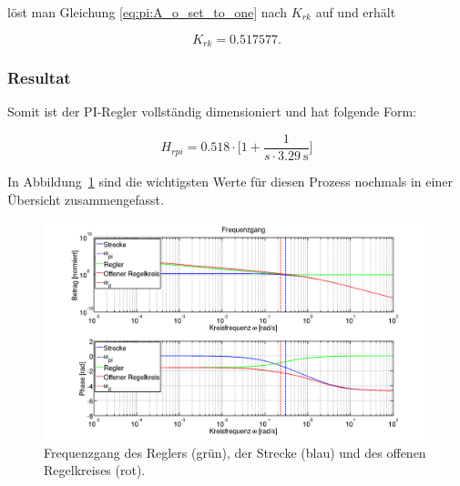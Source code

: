 l\"ost  man Gleichung  \ref{eq:pi:A_o_set_to_one}  nach  $K_{rk}$ auf  und
erh\"alt

\begin{equation} \label{eq:pi:k_rk_result}
    K_{rk} = 0.517577.
\end{equation}


\clearpage
\subsubsection{Resultat}

Somit ist der PI-Regler vollst\"andig dimensioniert und hat folgende Form:

\begin{equation} \label{eq:pi:result}
    H_{rpi} = 0.518 \cdot \biggl[ 1 + \frac{1}{s \cdot \SI{3.29}{\second}} \biggr]
\end{equation}

In Abbildung~\ref{fig:pi:all} sind die  wichtigsten Werte f\"ur diesen Prozess
nochmals in einer \"Ubersicht zusammengefasst.

\begin{figure}[h! width=\pagewidth]
    \includegraphics[width=\textwidth]{images/piBode.png}
    \caption{%
        Frequenzgang des Reglers (gr\"un), der  Strecke (blau) und des offenen
        Regelkreises (rot).
    }
    \label{fig:pi:all}
\end{figure}
